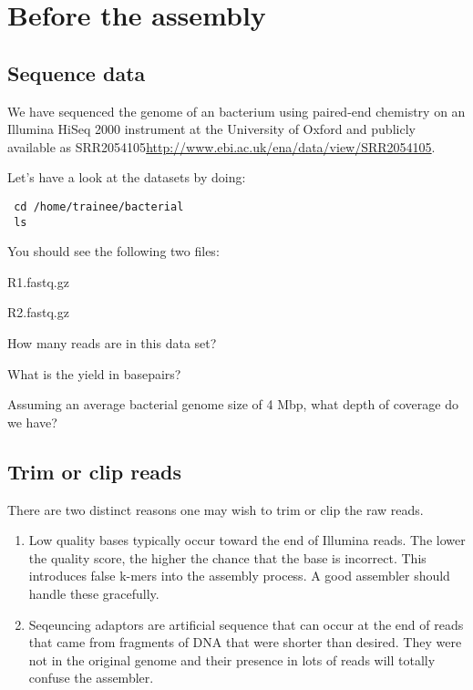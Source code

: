 \section{Before the assembly}
\subsection{Sequence data}
We have sequenced the genome of an bacterium using paired-end chemistry on 
an Illumina HiSeq 2000 instrument at the University of Oxford and publicly available as SRR2054105\url{http://www.ebi.ac.uk/ena/data/view/SRR2054105}.

\begin{steps}
Let's have a look at the datasets by doing:
\begin{lstlisting}
 cd /home/trainee/bacterial
 ls
\end{lstlisting}
You should see the following two files:
 \item R1.fastq.gz
 \item R2.fastq.gz
\end{steps}


\begin{questions}
How many reads are in this data set?
\begin{answer}
\end{answer}
What is the yield in basepairs?
\begin{answer}
\end{answer}
Assuming an average bacterial genome size of 4 Mbp, what depth of coverage do we have?
\begin{answer}
\end{answer}

\end{questions}



\subsection{Trim or clip reads}

There are two distinct reasons one may wish to trim or clip the raw reads.
\begin{enumerate}
\item Low quality bases typically occur toward the end of Illumina reads. The lower the quality score, the higher the chance that the base is incorrect. 
This introduces false k-mers into the assembly process. A good assembler should handle these gracefully.
\item Seqeuncing adaptors are artificial sequence that can occur at the end of reads that came from fragments of DNA that were shorter than desired. 
They were not in the original genome and their presence in lots of reads will totally confuse the assembler.
\end{enumerate}


